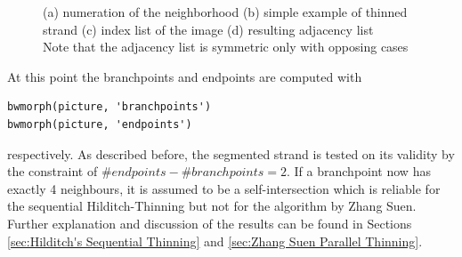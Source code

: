 \documentclass{article}
\begin{document}
\begin{figure}[H]
\begin{subfigure}[b]{0.33\textwidth}
		\caption{}
		\label{fig: example_adj}
	\end{subfigure}
	\captionsetup{justification=centering}
	\caption{(a) numeration of the neighborhood (b) simple example of thinned strand (c) index list of the image (d) resulting adjacency list \\
		Note that the adjacency list is symmetric only with opposing cases }
	\label{fig: adj_example} %
\end{figure}

At this point the branchpoints and endpoints are computed with
\begin{verbatim}
bwmorph(picture, 'branchpoints') 
bwmorph(picture, 'endpoints') 
\end{verbatim}
respectively. As described before, the segmented strand is tested on its validity by the constraint of $\#endpoints - \#branchpoints = 2$. If a branchpoint now has exactly 4 neighbours, it is assumed to be a self-intersection which is reliable for the sequential Hilditch-Thinning but not for the algorithm by Zhang Suen. Further explanation and discussion of the results can be found in Sections \ref{sec:Hilditch's Sequential Thinning} and \ref{sec:Zhang Suen Parallel Thinning}. \\
\end{document}
